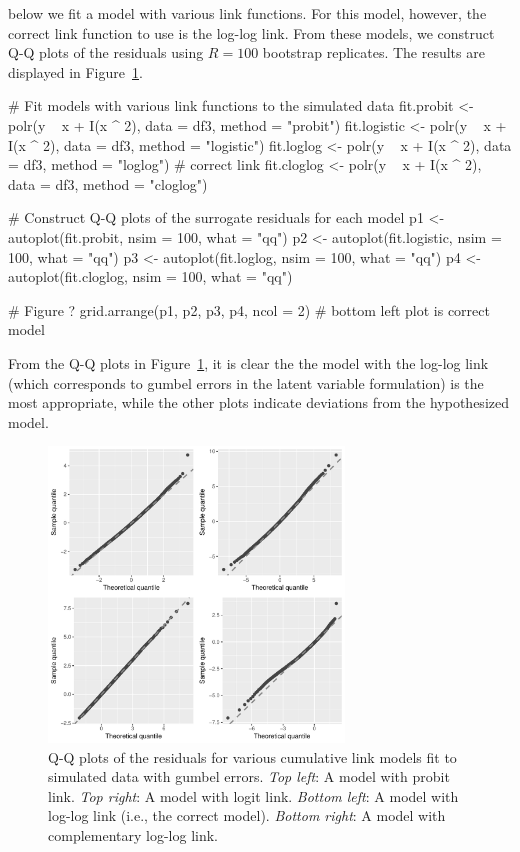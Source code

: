 below we fit a model with various link functions. For this model, however, the correct link function to use is the log-log link. From these models, we construct Q-Q plots of the residuals using $R = 100$ bootstrap replicates. The results are displayed in Figure~\ref{fig:link}.
\begin{example}
# Fit models with various link functions to the simulated data
fit.probit <- polr(y ~ x + I(x ^ 2), data = df3, method = "probit")
fit.logistic <- polr(y ~ x + I(x ^ 2), data = df3, method = "logistic")
fit.loglog <- polr(y ~ x + I(x ^ 2), data = df3, method = "loglog")  # correct link
fit.cloglog <- polr(y ~ x + I(x ^ 2), data = df3, method = "cloglog")

# Construct Q-Q plots of the surrogate residuals for each model
p1 <- autoplot(fit.probit, nsim = 100, what = "qq")
p2 <- autoplot(fit.logistic, nsim = 100, what = "qq")
p3 <- autoplot(fit.loglog, nsim = 100, what = "qq")
p4 <-  autoplot(fit.cloglog, nsim = 100, what = "qq")

# Figure ?
grid.arrange(p1, p2, p3, p4, ncol = 2)  # bottom left plot is correct model
\end{example}
From the Q-Q plots in Figure~\ref{fig:link}, it is clear the the model with the log-log link (which corresponds to gumbel errors in the latent variable formulation) is the most appropriate, while the other plots indicate deviations from the hypothesized model.

\begin{figure}[!htbp]
  \centering
  \includegraphics[width=0.7\textwidth]{link}
  \caption{Q-Q plots of the residuals for various cumulative link models fit to simulated data with gumbel errors. \textit{Top left}: A model with probit link. \textit{Top right}: A model with logit link. \textit{Bottom left}: A model with log-log link (i.e., the correct model). \textit{Bottom right}: A model with complementary log-log link.}  
  \label{fig:link}
\end{figure}

